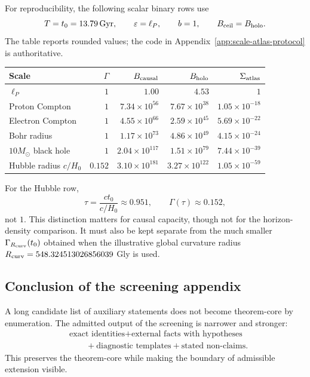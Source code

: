 \documentclass[11pt,a4paper]{article}
\begin{document}
For reproducibility, the following scalar binary rows use
\[
T=t_0=13.79\,{\rm Gyr},\qquad
\varepsilon=\ell_P,\qquad
b=1,\qquad
B_{\rm ceil}=B_{\rm holo}.
\]
The table reports rounded values; the code in Appendix~\ref{app:scale-atlas-protocol} is authoritative.

\begin{center}
\small
\begin{tabular}{lrrrr}
\toprule
Scale & \(\Gamma\) & \(B_{\rm causal}\) & \(B_{\rm holo}\) & \(\Sigma_{\rm atlas}\)\\
\midrule
\(\ell_P\) & \(1\) & \(1.00\) & \(4.53\) & \(1\)\\
Proton Compton & \(1\) & \(7.34\times10^{56}\) & \(7.67\times10^{38}\) & \(1.05\times10^{-18}\)\\
Electron Compton & \(1\) & \(4.55\times10^{66}\) & \(2.59\times10^{45}\) & \(5.69\times10^{-22}\)\\
Bohr radius & \(1\) & \(1.17\times10^{73}\) & \(4.86\times10^{49}\) & \(4.15\times10^{-24}\)\\
\(10M_\odot\) black hole & \(1\) & \(2.04\times10^{117}\) & \(1.51\times10^{79}\) & \(7.44\times10^{-39}\)\\
Hubble radius \(c/H_0\) & \(0.152\) & \(3.10\times10^{181}\) & \(3.27\times10^{122}\) & \(1.05\times10^{-59}\)\\
\bottomrule
\end{tabular}
\end{center}

For the Hubble row,
\[
\tau=\frac{ct_0}{c/H_0}\approx0.951,
\qquad
\Gamma(\tau)\approx0.152,
\]
not \(1\).  This distinction matters for causal capacity, though not for the horizon-density comparison.  It must also be kept separate from the much smaller $\Gamma_{R_{\rm curv}}(t_0)$ obtained when the illustrative global curvature radius $R_{\rm curv}=548.324513026856039$ Gly is used.

\subsection{Conclusion of the screening appendix}

A long candidate list of auxiliary statements does not become theorem-core by enumeration.  The admitted output of the screening is narrower and stronger:
\[
\begin{aligned}
&\text{exact identities}
+\text{external facts with hypotheses}\\
&\qquad
+\text{diagnostic templates}
+\text{stated non-claims}.
\end{aligned}
\]
This preserves the theorem-core while making the boundary of admissible extension visible.
\end{document}
